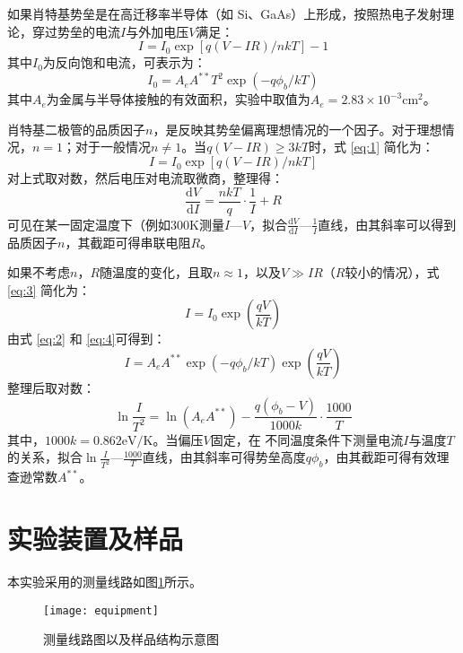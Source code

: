 \documentclass[aps,pre,12pt,preprint,onecolumn,showpacs,showkeys]{revtex4-1}
\def \d {\mathrm d}
\begin{document}
        如果肖特基势垒是在高迁移率半导体（如 Si、GaAs）上形成，按照热电子发射理论，穿过势垒的电流$I$与外加电压$V$满足：
        \begin{equation}\label{eq:1}
            I=I_0 {\exp[q(V-IR)/nkT]-1}    
        \end{equation}
        其中$I_0$为反向饱和电流，可表示为：
        \begin{equation}\label{eq:2}
            I_0 = A_e A^{**} T^2 \exp(-q \phi_b /k T)
        \end{equation}
        其中$A_e$为金属与半导体接触的有效面积，实验中取值为$A_e=2.83\times 10^{-3} \mathrm{cm}^2$。

        肖特基二极管的品质因子$n$，是反映其势垒偏离理想情况的一个因子。对于理想情况，$n=1$；对于一般情况$n \ne 1$。当$q(V-IR)\geqslant 3kT$时，式 \ref{eq:1} 简化为：
        \begin{equation}\label{eq:3}
            I=I_0 \exp[q(V-IR)/nkT]
        \end{equation}
        对上式取对数，然后电压对电流取微商，整理得：
        \begin{equation}
            \frac{\d V}{\d I}=\frac{nkT}{q}\cdot \frac{1}{I} + R
        \end{equation}
        可见在某一固定温度下（例如$300\mathrm{K}$测量$I$—$V$，拟合$\frac{\d V}{\d I}$—$\frac{1}{I}$直线，由其斜率可以得到品质因子$n$，其截距可得串联电阻$R$。

        如果不考虑$n$，$R$随温度的变化，且取$n\approx 1$，以及$V \gg IR$（$R$较小的情况），式 \ref{eq:3} 简化为：
        \begin{equation}\label{eq:4}
            I=I_0 \exp\left(\frac{qV}{kT}\right)
        \end{equation}
        由式 \ref{eq:2} 和 \ref{eq:4}可得到：
        \begin{equation}
            I=A_e A^{**} \exp(-q \phi_b/kT)\exp\left(\frac{qV}{kT}\right)
        \end{equation}
        整理后取对数：
        \begin{equation}\label{eq:7}
            \ln \frac{I}{T^2}=\ln (A_e A^{**})-\frac{q(\phi_b-V)}{1000 k} \cdot \frac{1000}{T}
        \end{equation}
        其中，$1000 k=0.862 \mathrm{eV/K}$。当偏压$V$固定，在 不同温度条件下测量电流$I$与温度$T$的关系，拟合$\ln \frac{I}{T^2}$—$\frac{1000}{T}$直线，由其斜率可得势垒高度$q\phi_b$，由其截距可得有效理查逊常数$A^{**}$。
    
\section{实验装置及样品}
    本实验采用的测量线路如图\ref{fig:equip}所示。
    \begin{figure}[h]
        \centering
        \texttt{[image: equipment]}
        \caption{\label{fig:equip}%
                测量线路图以及样品结构示意图}
    \end{figure}
    
\end{document}
